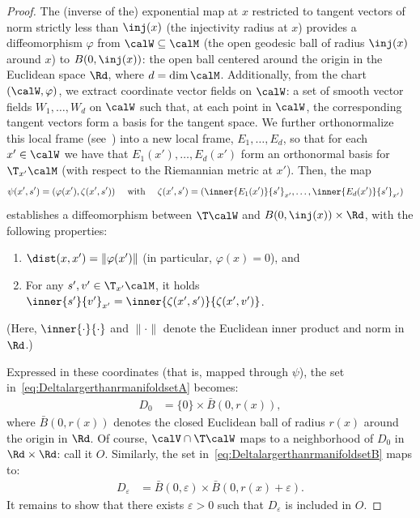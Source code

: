 \begin{proof}
	The (inverse of the) exponential map at $x$ restricted to tangent vectors of norm strictly less than $\inj(x)$ (the injectivity radius at $x$) provides a diffeomorphism $\varphi$ from $\calW \subseteq \calM$ (the open geodesic ball of radius $\inj(x)$ around $x$) to $B(0, \inj(x))$: the open ball centered around the origin in the Euclidean space $\Rd$, where $d = \dim\calM$. Additionally, from the chart $(\calW, \varphi)$, we extract coordinate vector fields on $\calW$: a set of smooth vector fields $W_1, \ldots, W_d$ on $\calW$ such that, at each point in $\calW$, the corresponding tangent vectors form a basis for the tangent space. We further orthonormalize this local frame (see~\citep[Prop.~2.8]{lee2018riemannian}) into a new local frame, $E_1, \ldots, E_d$, so that for each $x' \in \calW$ we have that $E_1(x'), \ldots, E_d(x')$ form an orthonormal basis for $\T_{x'}\calM$ (with respect to the Riemannian metric at $x'$). Then, the map
	\begin{align*}
	\psi(x', s') & = \left( \varphi(x'), \zeta(x', s') \right) & & \textrm{ with } & \zeta(x', s') & = \left( \inner{E_1(x')}{s'}_{x'}, \ldots, \inner{E_d(x')}{s'}_{x'} \right)
	\end{align*}
	establishes a diffeomorphism between $\T\calW$ and $B(0, \inj(x)) \times \Rd$, with the following properties:
	\begin{enumerate}
		\item $\dist(x, x') = \|\varphi(x')\|$ (in particular, $\varphi(x) = 0$), and
		\item For any $s', v' \in \T_{x'}\calM$, it holds $\inner{s'}{v'}_{x'} = \inner{\zeta(x', s')}{\zeta(x', v')}$.
	\end{enumerate}
	(Here, $\inner{\cdot}{\cdot}$ and $\|\cdot\|$ denote the Euclidean inner product and norm in $\Rd$.)
	
	Expressed in these coordinates (that is, mapped through $\psi$), the set in~\eqref{eq:DeltalargerthanrmanifoldsetA} becomes:
	\begin{align*}
	D_0 & = \{ 0 \} \times \bar B(0, r(x)),
	\end{align*}
	where $\bar B(0, r(x))$ denotes the closed Euclidean ball of radius $r(x)$ around the origin in $\Rd$. Of course, $\calV \cap \T\calW$ maps to a neighborhood of $D_0$ in $\Rd \times \Rd$: call it $O$. Similarly, the set in~\eqref{eq:DeltalargerthanrmanifoldsetB} maps to:
	\begin{align*}
	D_\varepsilon & = \bar B(0, \varepsilon) \times \bar B(0, r(x) + \varepsilon).
	\end{align*}
	It remains to show that there exists $\varepsilon > 0$ such that $D_\varepsilon$ is included in $O$. %
	

\end{proof}
